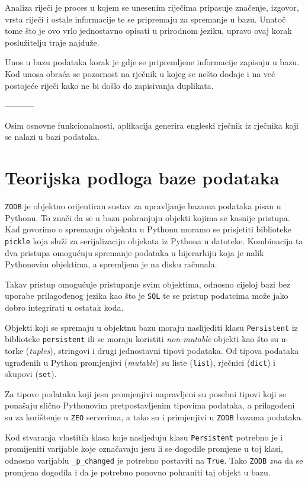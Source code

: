 \documentclass{foi}
\begin{document}
Analiza riječi je proces u kojem se unesenim riječima pripasuje značenje,
izgovor, vrsta riječi i ostale informacije te se pripremaju za spremanje u
bazu. Unatoč tome što je ovo vrlo jednostavno opisati u prirodnom jeziku,
upravo ovaj korak poslužitelju traje najduže.

Unos u bazu podataka korak je gdje se pripremljene informacije zapisuju u bazu.
Kod unosa obraća se pozornost na rječnik u kojeg se nešto dodaje i na već
postojeće riječi kako ne bi došlo do zapisivanja duplikata.

-----------

Osim osnovne funkcionalnosti, aplikacija generira engleski rječnik iz rječnika
koji se nalazi u bazi podataka.

\section{Teorijska podloga baze podataka}

\texttt{ZODB} je objektno orijentiran sustav za upravljanje bazama podataka
pisan u Pythonu. To znači da se u bazu pohranjuju objekti kojima se kasnije
pristupa. Kad govorimo o spremanju objekata u Pythonu moramo se prisjetiti
biblioteke \texttt{pickle} koja služi za serijalizaciju objekata iz Pythona u
datoteke. Kombinacija ta dva pristupa omogućuju spremanje podataka u
hijerarhiju koja je nalik Pythonovim objektima, a spremljena je na disku
računala.

Takav pristup omogućuje pristupanje svim objektima, odnosno cijeloj bazi bez
uporabe prilagođenog jezika kao što je \texttt{SQL} te se pristup podatcima
može jako dobro integrirati u ostatak koda.

Objekti koji se spremaju u objektnu bazu moraju naslijediti klasu
\texttt{Persistent} iz biblioteke \texttt{persistent} ili se moraju koristiti
\textit{non-mutable} objekti kao što su n-torke (\textit{tuples}), stringovi i
drugi jednostavni tipovi podataka. Od tipova podataka ugrađenih u Python
promjenjivi (\textit{mutable}) su liste (\texttt{list}), rječnici
(\texttt{dict}) i skupovi (\texttt{set}).

Za tipove podataka koji jesu promjenjivi napravljeni su posebni tipovi koji se
ponašaju slično Pythonovim pretpostavljenim tipovima podataka, a prilagođeni su
za korištenje u \texttt{ZEO} serverima, a tako su i primjenjivi u \texttt{ZODB}
bazama podataka.

Kod stvaranja vlastitih klasa koje nasljeđuju klasu \texttt{Persistent}
potrebno je i promijeniti varijable koje označavaju jesu li se dogodile
promjene u toj klasi, odnosno varijablu \texttt{\_p\_changed} je potrebno
postaviti na \texttt{True}. Tako \texttt{ZODB} \textit{zna} da se promjena
dogodila i da je potrebno ponovno pohraniti taj objekt u bazu.
\end{document}
